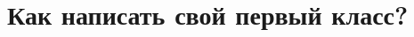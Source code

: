 \documentclass[10pt]{book}
\begin{document}
\section{Как написать свой первый класс?}
\end{document}
